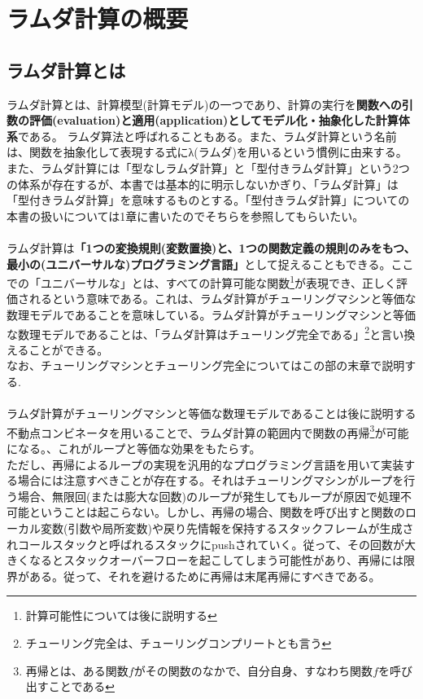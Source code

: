 \chapter{ラムダ計算の概要}{
	\section{ラムダ計算とは}{
		ラムダ計算とは、計算模型(計算モデル)の一つであり、計算の実行を{\bf 関数への引数の評価(evaluation)と適用(application)としてモデル化・抽象化した計算体系}である。
		ラムダ算法と呼ばれることもある。また、ラムダ計算という名前は、関数を抽象化して表現する式にλ(ラムダ)を用いるという慣例に由来する。
		また、ラムダ計算には「型なしラムダ計算」と「型付きラムダ計算」という2つの体系が存在するが、本書では基本的に明示しないかぎり、「ラムダ計算」は「型付きラムダ計算」を意味するものとする。「型付きラムダ計算」についての本書の扱いについては1章に書いたのでそちらを参照してもらいたい。\\
		\\
		ラムダ計算は{\bf 「1つの変換規則(変数置換)と、1つの関数定義の規則のみをもつ、最小の(ユニバーサルな)プログラミング言語」}として捉えることもできる。ここでの「ユニバーサルな」とは、すべての計算可能な関数\footnote{計算可能性については後に説明する}が表現でき、正しく評価されるという意味である。これは、ラムダ計算がチューリングマシンと等価な数理モデルであることを意味している。ラムダ計算がチューリングマシンと等価な数理モデルであることは、「ラムダ計算はチューリング完全である」\footnote{チューリング完全は、チューリングコンプリートとも言う}と言い換えることができる。\\
		なお、チューリングマシンとチューリング完全についてはこの部の末章で説明する. \\
		\\
		ラムダ計算がチューリングマシンと等価な数理モデルであることは後に説明する不動点コンビネータを用いることで、ラムダ計算の範囲内で関数の再帰\footnote{再帰とは、ある関数$f$がその関数のなかで、自分自身、すなわち関数$f$を呼び出すことである}が可能になる。、これがループと等価な効果をもたらす。\\
		ただし、再帰によるループの実現を汎用的なプログラミング言語を用いて実装する場合には注意すべきことが存在する。それはチューリングマシンがループを行う場合、無限回(または膨大な回数)のループが発生してもループが原因で処理不可能ということは起こらない。しかし、再帰の場合、関数を呼び出すと関数のローカル変数(引数や局所変数)や戻り先情報を保持するスタックフレームが生成されコールスタックと呼ばれるスタックにpushされていく。従って、その回数が大きくなるとスタックオーバーフローを起こしてしまう可能性があり、再帰には限界がある。従って、それを避けるために再帰は末尾再帰にすべきである。
	}
}

